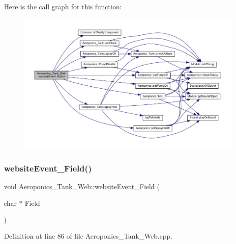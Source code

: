 Here is the call graph for this function\+:
\nopagebreak
\begin{figure}[H]
\begin{center}
\leavevmode
\includegraphics[width=350pt]{class_aeroponics___tank___web_a2dea9353cb1709b51f496d8d0caa928e_cgraph}
\end{center}
\end{figure}
\mbox{\label{class_aeroponics___tank___web_a5693a6f3eacc0a155e5639607368e0ea}} 
\subsubsection{\texorpdfstring{website\+Event\+\_\+\+Field()}{websiteEvent\_Field()}}
{\footnotesize\ttfamily void Aeroponics\+\_\+\+Tank\+\_\+\+Web\+::website\+Event\+\_\+\+Field (\begin{DoxyParamCaption}\item[{char $\ast$}]{Field }\end{DoxyParamCaption})}



Definition at line 86 of file Aeroponics\+\_\+\+Tank\+\_\+\+Web.\+cpp.

